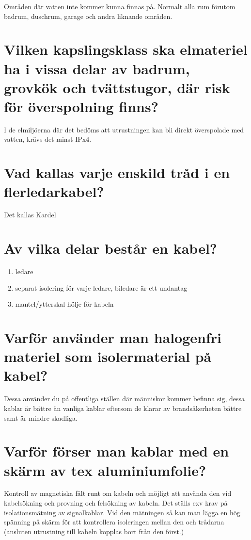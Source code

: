 \documentclass[a4paper,swedish]{article}
\begin{document}
Områden där vatten inte kommer kunna finnas på. Normalt alla rum förutom badrum, duschrum, garage och andra liknande områden.

\section{Vilken kapslingsklass ska elmateriel ha i vissa delar av badrum, grovkök och
  tvättstugor, där risk för överspolning finns?}

I de elmiljöerna där det bedöms att utrustningen kan bli direkt överspolade med vatten, krävs det minst IPx4.

\section{Vad kallas varje enskild tråd i en flerledarkabel?}
\label{sec:q_m_10}

Det kallas Kardel

\section{Av vilka delar består en kabel?}

\begin{enumerate}
\item ledare
\item separat isolering för varje ledare, biledare är ett undantag
\item mantel/ytterskal hölje för kabeln
\end{enumerate}

\section{Varför använder man halogenfri materiel som isolermaterial på kabel?}
\label{sec:q_m_12}

Dessa använder du på offentliga ställen där människor kommer befinna sig, dessa kablar är bättre än
vanliga kablar eftersom de klarar av brandsäkerheten bättre samt är mindre skadliga.

\section{Varför förser man kablar med en skärm av tex aluminiumfolie?}

Kontroll av magnetiska fält runt om kabeln och möjligt att använda den vid kabelsökning
och provning och felsökning av kabeln. Det ställs exv krav på isolationsmätning av signalkablar.
Vid den mätningen så kan man lägga en hög spänning på skärm för att kontrollera isoleringen
mellan den och trådarna (ansluten utrustning till kabeln kopplas bort från den först.)
\end{document}
